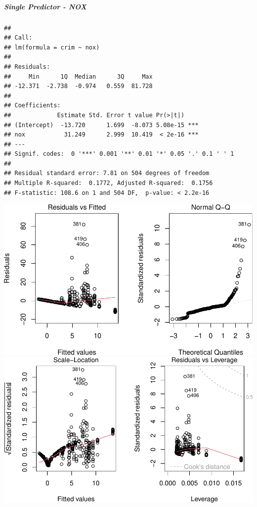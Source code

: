 \documentclass[
]{article}
\begin{document}
\hypertarget{single-predictor---nox}{%
\subparagraph{\texorpdfstring{\textbf{Single Predictor -
NOX}}{Single Predictor - NOX}}\label{single-predictor---nox}}

\begin{verbatim}
## 
## Call:
## lm(formula = crim ~ nox)
## 
## Residuals:
##     Min      1Q  Median      3Q     Max 
## -12.371  -2.738  -0.974   0.559  81.728 
## 
## Coefficients:
##             Estimate Std. Error t value Pr(>|t|)    
## (Intercept)  -13.720      1.699  -8.073 5.08e-15 ***
## nox           31.249      2.999  10.419  < 2e-16 ***
## ---
## Signif. codes:  0 '***' 0.001 '**' 0.01 '*' 0.05 '.' 0.1 ' ' 1
## 
## Residual standard error: 7.81 on 504 degrees of freedom
## Multiple R-squared:  0.1772, Adjusted R-squared:  0.1756 
## F-statistic: 108.6 on 1 and 504 DF,  p-value: < 2.2e-16
\end{verbatim}

\includegraphics{Disha_Gandhi_Take_Home_Exam_PDF_files/figure-latex/unnamed-chunk-21-1.pdf}
\includegraphics{Disha_Gandhi_Take_Home_Exam_PDF_files/figure-latex/unnamed-chunk-21-2.pdf}
\end{document}
